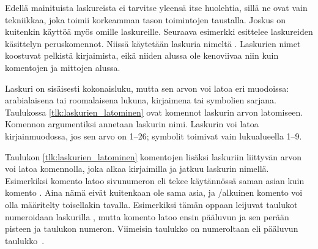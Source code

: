 Edellä mainituista laskureista ei tarvitse yleensä itse huolehtia, sillä
ne ovat vain tekniikkaa, joka toimii korkeamman tason toimintojen
taustalla. Joskus on kuitenkin käyttöä myös omille laskureille. Seuraava
esimerkki esittelee laskureiden käsittelyn peruskomennot. Niissä
käytetään laskuria nimeltä . Laskurien nimet koostuvat
pelkistä kirjaimista, eikä niiden alussa ole kenoviivaa niin kuin
komentojen ja mittojen alussa.

\begin{koodilohkosis}
\setcounter{oma}{3}    %
\addtocounter{oma}{1}  %
\addtocounter{oma}{-1} %
\end{koodilohkosis}

Laskuri on sisäisesti kokonaisluku, mutta sen arvon voi latoa eri
muodoissa: arabialaisena tai roomalaisena lukuna, kirjaimena tai
symbolien sarjana. Taulukossa \ref{tlk:laskurien_latominen} ovat komennot
laskurin arvon latomiseen. Komennon argumentiksi annetaan laskurin nimi.
Laskurin voi latoa kirjainmuodossa, jos sen arvo on 1--26; symbolit
toimivat vain lukualueella 1--9.


Taulukon \ref{tlk:laskurien_latominen} komentojen lisäksi laskuriin
liittyvän arvon voi latoa komennolla, joka alkaa kirjaimilla
 ja jatkuu laskurin nimellä. Esimerkiksi komento
 latoo sivunumeron eli tekee käytännössä saman asian
kuin komento . Aina nämä eivät kuitenkaan ole
sama asia, ja \-/alkuinen komento voi olla määritelty
toisellakin tavalla. Esimerkiksi tämän oppaan leijuvat taulukot
numeroidaan laskurilla , mutta komento 
latoo ensin pääluvun ja sen perään pisteen ja taulukon numeron.
Viimeisin taulukko on numeroltaan \thetable{} eli
pääluvun~ taulukko~.

